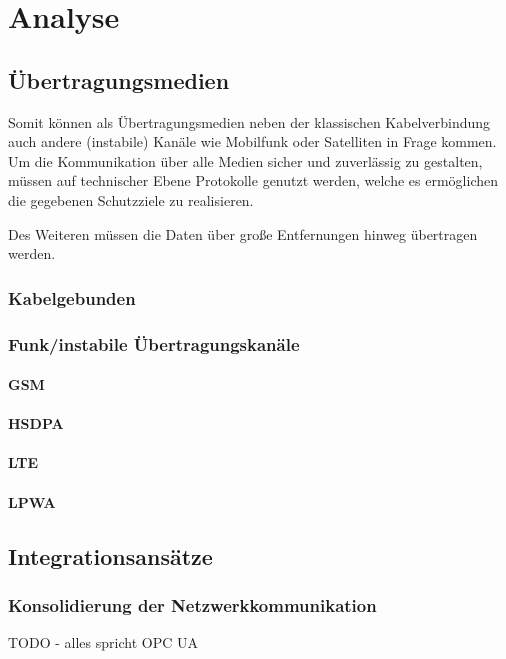 \chapter{Analyse}

\section{Übertragungsmedien}

Somit können als Übertragungsmedien neben der klassischen Kabelverbindung auch andere (instabile) Kanäle wie Mobilfunk oder Satelliten in Frage kommen. Um die Kommunikation über alle Medien sicher und zuverlässig zu gestalten, müssen auf technischer Ebene Protokolle genutzt werden, welche es ermöglichen die gegebenen Schutzziele zu realisieren.

Des Weiteren müssen die Daten über große Entfernungen hinweg übertragen werden. 

\subsection{Kabelgebunden}
\subsection{Funk/instabile Übertragungskanäle}
\subsubsection{\ac{GSM}}
\subsubsection{\ac{HSDPA}}
\subsubsection{\ac{LTE}}
\subsubsection{\ac{LPWA}}

\section{Integrationsansätze}
\subsection{Konsolidierung der Netzwerkkommunikation}
TODO - alles spricht OPC UA

